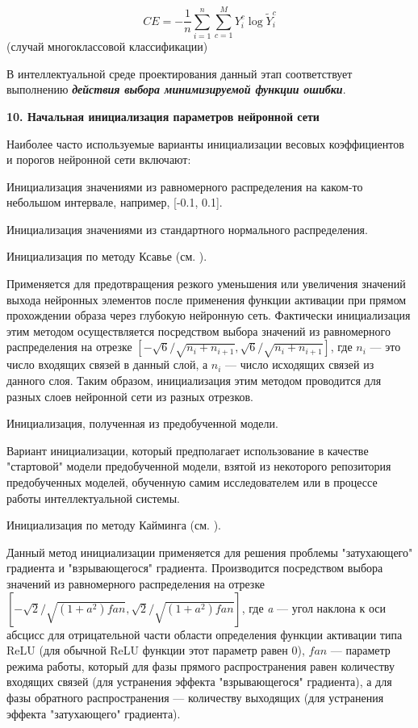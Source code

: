 \begin{equation*}
	CE = - \frac{1}{n} \sum_{i=1}^n \sum_{c=1}^M Y_i^c \log{\widetilde{Y}_i^c}
\end{equation*}
(случай многоклассовой классификации)

В интеллектуальной среде проектирования данный этап соответствует выполнению \textbf{\textit{действия выбора минимизируемой функции ошибки}}.


\textbf{10. Начальная инициализация параметров нейронной сети}

Наиболее часто используемые варианты инициализации весовых коэффициентов и порогов нейронной сети включают:
\begin{textitemize}
	\item Инициализация значениями из равномерного распределения на каком-то небольшом интервале, например, [-0.1, 0.1].
	\item Инициализация значениями из стандартного нормального распределения.
	\item Инициализация по методу Ксавье (см. ).

	Применяется для предотвращения резкого уменьшения или увеличения значений выхода нейронных элементов после применения функции активации при прямом прохождении образа через глубокую нейронную сеть. Фактически инициализация этим методом осуществляется посредством выбора значений из равномерного распределения на отрезке $[- \sqrt{6} / \sqrt{n_i+n_{i+1}}, \sqrt{6} / \sqrt{n_i+n_{i+1}}]$, где $n_i$ --- это число входящих связей в данный слой, а $n_i$ --- число исходящих связей из данного слоя. Таким образом, инициализация этим методом проводится для разных слоев нейронной сети из разных отрезков.

	\item Инициализация, полученная из предобученной модели.

	Вариант инициализации, который предполагает использование в качестве "стартовой"{} модели предобученной модели, взятой из некоторого репозитория предобученных моделей, обученную самим исследователем или в процессе работы интеллектуальной системы.

	\item Инициализация по методу Кайминга (см. ).

	Данный метод инициализации применяется для решения проблемы "затухающего"{} градиента и "взрывающегося"{}
	градиента. Производится посредством выбора значений из равномерного распределения на отрезке $[-\sqrt{2} / \sqrt{(1+a^2)fan}, \sqrt{2} / \sqrt{(1+a^2)fan}]$,
	где \textit{a} --- угол наклона к оси абсцисс для отрицательной части области определения функции активации типа ReLU (для обычной ReLU функции этот параметр равен 0), $fan$ --- параметр режима работы, который для фазы прямого распространения равен количеству входящих связей (для устранения эффекта "взрывающегося"{} градиента), а для фазы обратного распространения --- количеству выходящих (для устранения эффекта "затухающего"{} градиента).
\end{textitemize}

